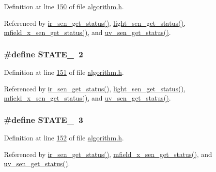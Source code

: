 Definition at line \hyperlink{a00021_source_l00150}{150} of file \hyperlink{a00021_source}{algorithm.\+h}.



Referenced by \hyperlink{a00045_source_l00302}{ir\+\_\+sen\+\_\+get\+\_\+status()}, \hyperlink{a00047_source_l00204}{light\+\_\+sen\+\_\+get\+\_\+status()}, \hyperlink{a00050_source_l00276}{mfield\+\_\+x\+\_\+sen\+\_\+get\+\_\+status()}, and \hyperlink{a00073_source_l00302}{uv\+\_\+sen\+\_\+get\+\_\+status()}.

\hypertarget{a00021_a66fa48e832a64af4d405511cecc4c752}{
\subsubsection[{S\+T\+A\+T\+E\+\_\+2}]{\setlength{\rightskip}{0pt plus 5cm}\#define S\+T\+A\+T\+E\+\_~2}}\label{a00021_a66fa48e832a64af4d405511cecc4c752}


Definition at line \hyperlink{a00021_source_l00151}{151} of file \hyperlink{a00021_source}{algorithm.\+h}.



Referenced by \hyperlink{a00045_source_l00302}{ir\+\_\+sen\+\_\+get\+\_\+status()}, \hyperlink{a00047_source_l00204}{light\+\_\+sen\+\_\+get\+\_\+status()}, \hyperlink{a00050_source_l00276}{mfield\+\_\+x\+\_\+sen\+\_\+get\+\_\+status()}, and \hyperlink{a00073_source_l00302}{uv\+\_\+sen\+\_\+get\+\_\+status()}.

\hypertarget{a00021_ad87f1bc8466a25d9f7da68717d324a22}{
\subsubsection[{S\+T\+A\+T\+E\+\_\+3}]{\setlength{\rightskip}{0pt plus 5cm}\#define S\+T\+A\+T\+E\+\_~3}}\label{a00021_ad87f1bc8466a25d9f7da68717d324a22}


Definition at line \hyperlink{a00021_source_l00152}{152} of file \hyperlink{a00021_source}{algorithm.\+h}.



Referenced by \hyperlink{a00045_source_l00302}{ir\+\_\+sen\+\_\+get\+\_\+status()}, \hyperlink{a00050_source_l00276}{mfield\+\_\+x\+\_\+sen\+\_\+get\+\_\+status()}, and \hyperlink{a00073_source_l00302}{uv\+\_\+sen\+\_\+get\+\_\+status()}.


